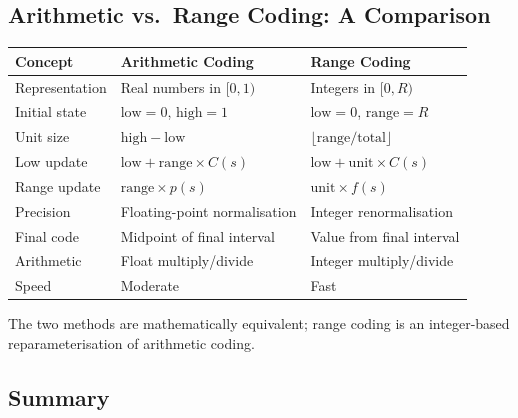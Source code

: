 \subsection{Arithmetic vs.\ Range Coding: A Comparison}

\begin{center}
\begin{tabular}{@{}p{3.8cm}p{4.8cm}p{4.8cm}@{}}
\toprule
\textbf{Concept} & \textbf{Arithmetic Coding} & \textbf{Range Coding} \\
\midrule
Representation & Real numbers in $[0,1)$ & Integers in $[0, R)$ \\
Initial state & $\mathrm{low}=0$, $\mathrm{high}=1$ & $\mathrm{low}=0$, $\mathrm{range}=R$ \\
Unit size & $\mathrm{high} - \mathrm{low}$ & $\lfloor\mathrm{range}/\mathrm{total}\rfloor$ \\
Low update & $\mathrm{low} + \mathrm{range} \times C(s)$ & $\mathrm{low} + \mathrm{unit} \times C(s)$ \\
Range update & $\mathrm{range} \times p(s)$ & $\mathrm{unit} \times f(s)$ \\
Precision & Floating-point normalisation & Integer renormalisation \\
Final code & Midpoint of final interval & Value from final interval \\
Arithmetic & Float multiply/divide & Integer multiply/divide \\
Speed & Moderate & Fast \\
\bottomrule
\end{tabular}
\end{center}

The two methods are mathematically equivalent; range coding is an
integer-based reparameterisation of arithmetic coding.

\subsection{Summary}

